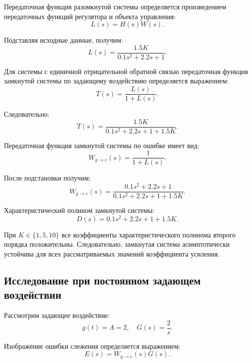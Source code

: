 \documentclass[12pt, a4paper]{article}
\begin{document}
Передаточная функция разомкнутой системы определяется
произведением передаточных функций регулятора
и объекта управления:
\begin{equation*}
    L(s)=H(s)W(s).
\end{equation*}

Подставляя исходные данные, получим:
\begin{equation*}
    L(s)=\frac{1.5K}{0.1s^2+2.2s+1}.
\end{equation*}

Для системы с единичной отрицательной обратной связью
передаточная функция замкнутой системы по задающему
воздействию определяется выражением:
\begin{equation*}
    T(s)=\frac{L(s)}{1+L(s)}.
\end{equation*}

Следовательно:
\begin{equation}
    \boxed{
    T(s)=
    \frac{1.5K}
    {0.1s^2+2.2s+1+1.5K}
    }.
\end{equation}

Передаточная функция замкнутой системы по ошибке
имеет вид:
\begin{equation*}
    W_{g\to e}(s)=\frac{1}{1+L(s)}.
\end{equation*}

После подстановки получим:
\begin{equation}
    \boxed{
    W_{g\to e}(s)=
    \frac{0.1s^2+2.2s+1}
    {0.1s^2+2.2s+1+1.5K}
    }.
\end{equation}

Характеристический полином замкнутой системы:
\begin{equation*}
    D(s)=0.1s^2+2.2s+1+1.5K.
\end{equation*}

При $K\in\{1,5,10\}$ все коэффициенты
характеристического полинома второго порядка
положительны. Следовательно, замкнутая система
асимптотически устойчива для всех рассматриваемых
значений коэффициента усиления.


\subsection{Исследование при постоянном задающем воздействии}

Рассмотрим задающее воздействие:
\begin{equation*}
    g(t)=A=2, \quad G(s)=\frac{2}{s}.
\end{equation*}

Изображение ошибки слежения определяется выражением:
\begin{equation*}
    E(s)=W_{g\to e}(s)G(s).
\end{equation*}
\end{document}
